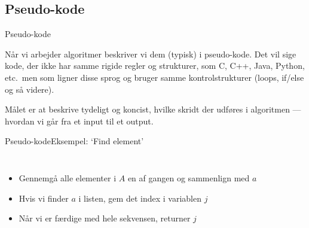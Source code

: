 \documentclass{beamer}
\begin{document}
\subsection{Pseudo-kode}

\begin{frame}{Pseudo-kode}

    Når vi arbejder algoritmer beskriver vi dem (typisk) i \alert{pseudo-kode}.
    Det vil sige kode, der ikke har samme rigide regler og strukturer, som C,
    C++, Java, Python, etc.\ men som ligner disse sprog og bruger samme
    kontrolstrukturer (loops, if/else og så videre).

    \medskip

    Målet er at beskrive \alert{tydeligt og koncist}, hvilke skridt der udføres
    i algoritmen --- hvordan vi går fra et \alert{input} til et \alert{output}.

\end{frame}

\begin{frame}{Pseudo-kode}{Eksempel: `Find element'}

    \begin{columns}
        \begin{itemize}
            \item Gennemgå alle elementer i $A$ en af gangen og sammenlign med
                $a$
            \item Hvis vi finder $a$ i listen, gem det index i variablen
                $j$
            \item Når vi er færdige med hele sekvensen, returner $j$
        \end{itemize}



    \end{columns}

\end{frame}
\end{document}

